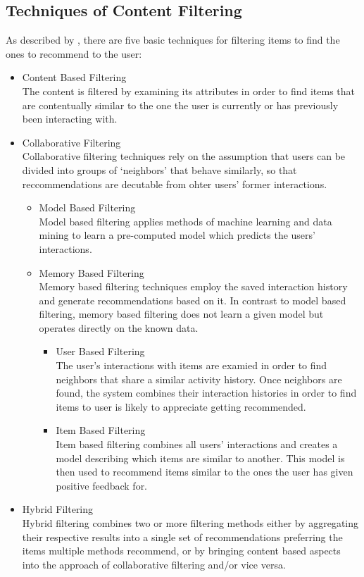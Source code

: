 \subsection{Techniques of Content Filtering}
As described by \cite{Isinkaye2015261}, there are five basic techniques for filtering items to find the ones to recommend to the user:
\begin{itemize}
	\item Content Based Filtering\\
		The content is filtered by examining its attributes in order to find items that are contentually similar to the one the user is currently or has previously been interacting with.
	\item Collaborative Filtering\\
		Collaborative filtering techniques rely on the assumption that users can be divided into groups of `neighbors' that behave similarly, so that reccommendations are decutable from ohter users' former interactions.
		\begin{itemize}
			\item Model Based Filtering\\
			Model based filtering applies methods of machine learning and data mining to learn a pre-computed model which predicts the users' interactions.
			\item Memory Based Filtering\\
			Memory based filtering techniques employ the saved interaction history and generate recommendations based on it. In contrast to model based filtering, memory based filtering does not learn a given model but operates directly on the known data.
			\begin{itemize}
				\item User Based Filtering\\
				The user's interactions with items are examied in order to find neighbors that share a similar activity history. Once neighbors are found, the system combines their interaction histories in order to find items to user is likely to appreciate getting recommended.
				\item Item Based Filtering\\
				Item based filtering combines all users' interactions and creates a model describing which items are similar to another. This model is then used to recommend items similar to the ones the user has given positive feedback for.
			\end{itemize}
		\end{itemize}
	\item Hybrid Filtering\\
	Hybrid filtering combines two or more filtering methods either by aggregating their respective results into a single set of recommendations preferring the items multiple methods recommend, or by bringing content based aspects into the approach of collaborative filtering and/or vice versa.
\end{itemize}

